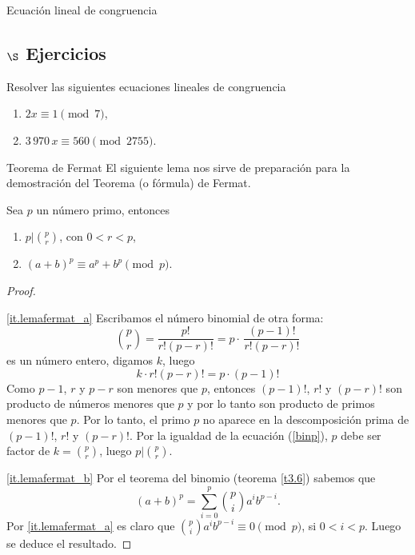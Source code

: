 \begin{section}{Ecuación lineal de congruencia}
\subsection*{$\S$ Ejercicios}
Resolver las siguientes ecuaciones lineales de congruencia
\begin{enumerate}
\item $2x \equiv 1 \pmod{7}$,

\item $3\,970\, x \equiv 560 \pmod{2755}$.
\end{enumerate}

\end{section}



\begin{section}{Teorema de Fermat} 
El siguiente lema nos sirve de preparación para la demostración
del Teorema (o fórmula) de Fermat.

\begin{lema} \label{l4.3} Sea $p$ un número primo, entonces
\begin{enumerate}[label=\textit{\alph*)}]
\item\label{it.lemafermat_a}  $p|\binom{p}{r}$, con $0< r <p$,
\item\label{it.lemafermat_b}  $(a+b)^p \equiv a^p+b^p \pmod{p}$.
\end{enumerate}
\end{lema}
\begin{proof}
    \
    
    \ref{it.lemafermat_a} Escribamos el número binomial de otra forma: 
$$
\binom{p}{r}=\frac{p!}{r!(p-r)!}=p\cdot\,\frac{(p-1)!}{r!(p-r)!}
$$ 
es un número entero, digamos $k$, luego 
\begin{equation}\label{binp}
k \cdot r!(p-r)! = p \cdot(p-1)!
\end{equation}
Como $p-1$, $r$ y $p-r$ son menores que $p$, entonces  $(p-1)!$, $r!$ y $(p-r)!$ son producto de números menores que $p$ y por lo tanto son producto de primos menores que $p$. 
Por lo tanto, el primo $p$ no aparece en la descomposición prima de $(p-1)!$, $r!$ y $(p-r)!$. Por la igualdad de la ecuación (\ref{binp}), $p$ debe ser factor de $k = \binom{p}{r}$, luego $p|\binom{p}{r}$.

\ref{it.lemafermat_b} Por el teorema del binomio (teorema \ref{t3.6}) sabemos que
$$
(a+b)^p =\sum_{i=0}^{p} \binom{p}{i} a^ib^{p-i}.
$$
Por \ref{it.lemafermat_a} es claro que $ \binom{p}{i} a^ib^{p-i}\equiv 0 \pmod{p}$,
si $0<i<p$. Luego se deduce el resultado.
\end{proof}


\end{section}
